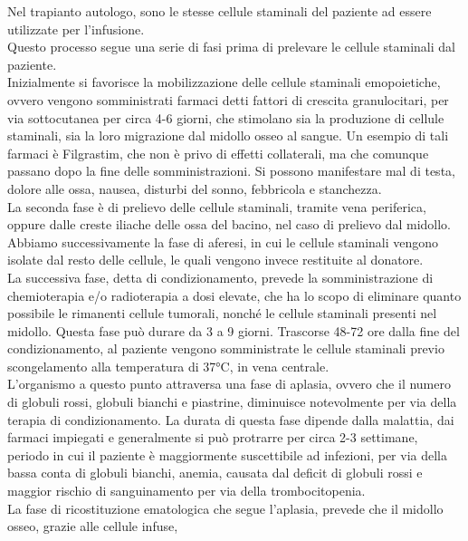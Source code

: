 Nel trapianto autologo, sono le stesse cellule staminali del paziente ad essere utilizzate per l’infusione.\\ 
Questo  processo segue una serie di fasi prima di prelevare le cellule staminali dal paziente.\\ Inizialmente si 
favorisce  la mobilizzazione delle cellule staminali emopoietiche, ovvero vengono somministrati farmaci detti fattori 
di crescita granulocitari, per via sottocutanea per circa 4-6 giorni, che stimolano sia la 
produzione di cellule staminali, sia la loro migrazione dal midollo osseo al sangue\cite{TRAPIANTO}.
Un esempio di tali farmaci è Filgrastim, che non è privo di effetti collaterali, ma che comunque passano dopo la fine 
delle somministrazioni. Si possono manifestare mal di testa, dolore alle ossa, nausea, disturbi del sonno, 
febbricola e stanchezza\cite{STEMCELLS}.\\
La seconda fase è di prelievo delle cellule staminali, tramite vena periferica, oppure dalle creste iliache delle 
ossa del bacino, nel caso di prelievo dal midollo.\\ 
Abbiamo successivamente la fase di aferesi, in cui le cellule staminali vengono isolate dal resto delle cellule, 
le quali vengono invece restituite al donatore.\\ 
La successiva fase, detta di condizionamento, prevede la somministrazione di chemioterapia e/o radioterapia a dosi 
elevate, che ha lo scopo di eliminare quanto possibile le rimanenti cellule tumorali, nonché le cellule staminali 
presenti nel midollo. Questa fase può durare da 3 a 9 giorni. Trascorse 48-72 ore dalla fine del condizionamento, 
al paziente vengono somministrate le cellule staminali previo scongelamento alla temperatura di 37°C, in vena centrale\cite{TRAPIANTO}.\\
L’organismo a questo punto attraversa una fase di aplasia, ovvero che il numero di globuli rossi, globuli bianchi e 
piastrine, diminuisce notevolmente per via della terapia di condizionamento. La durata di questa fase dipende 
dalla malattia, dai farmaci impiegati e generalmente si può protrarre per circa 2-3 settimane\cite{TRAPIANTO}, 
periodo in cui il paziente è maggiormente suscettibile ad infezioni, per via della bassa conta di globuli bianchi, 
anemia, causata dal deficit di globuli rossi e maggior rischio di sanguinamento per via della trombocitopenia\cite{LLSBLOOD}.\\
La fase di ricostituzione ematologica che segue l’aplasia, prevede che il midollo osseo, grazie alle cellule infuse, 
